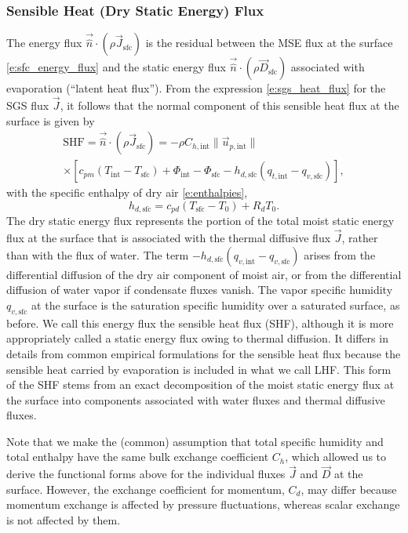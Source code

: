 \documentclass{report}
\begin{document}
\subsubsection{Sensible Heat (Dry Static Energy) Flux} The energy flux $\vec{\hat n} \cdot (\rho \vec{J}_{\mathrm{sfc}})$ is the residual between the MSE flux at the surface \eqref{e:sfc_energy_flux} and the static energy flux $\vec{\hat n} \cdot (\rho \vec{D}_\mathrm{sfc})$ associated with evaporation (``latent heat flux''). From the expression \eqref{e:sgs_heat_flux} for the SGS flux $\vec{J}$, it follows that the normal component of this sensible heat flux at the surface is given by 
\begin{multline}\label{e:sfc_SHF}
    \mathrm{SHF} = \vec{\hat n} \cdot (\rho \vec{J}_{\mathrm{sfc}}) =
    -\rho C_{h, \mathrm{int}} \| \vec{u}_{p, \mathrm{int}} \|
    \\
    \times \left[ c_{pm} \left(T_\mathrm{int} - T_\mathrm{sfc} \right) + \Phi_\mathrm{int} - \Phi_\mathrm{sfc}
    - h_{d,\mathrm{sfc}}  \left( q_{t, \mathrm{int}} - q_{v, \mathrm{sfc}} \right) \right],
\end{multline}
with the specific enthalpy of dry air \eqref{e:enthalpies},
\[
h_{d, \mathrm{sfc}} = c_{pd} (T_\mathrm{sfc} - T_0) + R_d T_0.
\]
The dry static energy flux represents the portion of the total moist static energy flux at the surface that is associated with the thermal diffusive flux $\vec{J}$, rather than with the flux of water. The term $-h_{d,\mathrm{sfc}}  \left( q_{v, \mathrm{int}} - q_{v, \mathrm{sfc}} \right)$ arises from the differential diffusion of the dry air component of moist air, or from the differential diffusion of water vapor if condensate fluxes vanish. The vapor specific humidity $q_{v, \mathrm{sfc}}$ at the surface is the saturation specific humidity over a saturated surface, as before. We call this energy flux the sensible heat flux (SHF), although it is more appropriately called a static energy flux owing to thermal diffusion. It differs in details from common empirical formulations for the sensible heat flux because the sensible heat carried by evaporation is included in what we call LHF. This form of the SHF stems from an exact decomposition of the moist static energy flux at the surface into components associated with water fluxes and thermal diffusive fluxes.

Note that we make the (common) assumption that total specific humidity and total enthalpy have the same bulk exchange coefficient $C_h$, which allowed us to derive the functional forms above for the individual fluxes $\vec{J}$ and $\vec{D}$ at the surface.  However, the exchange coefficient for momentum, $C_d$, may differ because momentum exchange is affected by pressure fluctuations, whereas scalar exchange is not affected by them.
\end{document}
